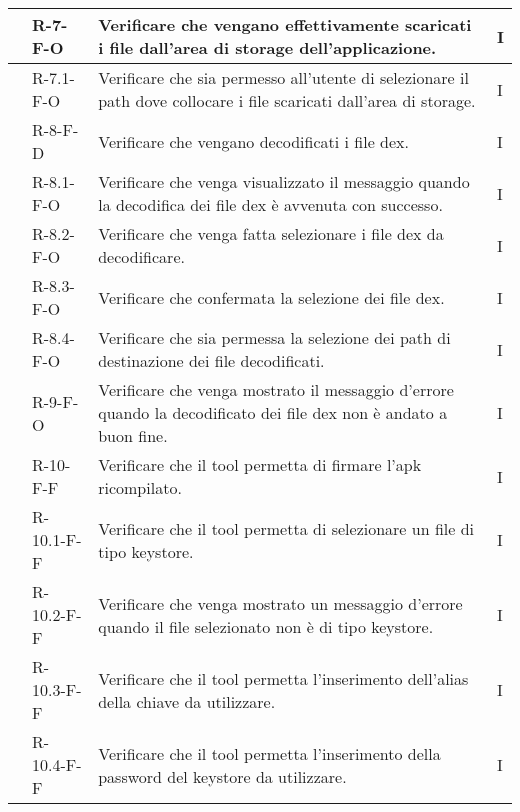 \begin{longtable}{ | C{1.5cm} |C{2cm} |C{7cm} |C{1.5cm}|}
     & R-7-F-O    & Verificare che vengano effettivamente scaricati i file dall'area di storage dell'applicazione.& I \\\hline
     & R-7.1-F-O  & Verificare che sia permesso all'utente di selezionare il path dove collocare i file scaricati dall'area di storage.& I \\\hline
     & R-8-F-D    & Verificare che vengano decodificati i file dex.& I \\\hline
     & R-8.1-F-O  & Verificare che venga visualizzato il messaggio quando la decodifica dei file dex è avvenuta con successo.& I \\\hline
     & R-8.2-F-O  & Verificare che venga fatta selezionare i file dex da decodificare.& I \\\hline
     & R-8.3-F-O  & Verificare che confermata la selezione dei file dex.& I \\\hline
     & R-8.4-F-O  & Verificare che sia permessa la selezione dei path di destinazione dei file decodificati.& I \\\hline
     & R-9-F-O    & Verificare che venga mostrato il messaggio d'errore quando la decodificato dei file dex non è andato a buon fine.& I \\\hline
     & R-10-F-F   & Verificare che il tool permetta di firmare l'apk ricompilato.& I \\\hline
     & R-10.1-F-F & Verificare che il tool permetta di selezionare un file di tipo keystore.& I \\\hline
     & R-10.2-F-F & Verificare che venga mostrato un messaggio d'errore quando il file selezionato non è di tipo keystore.& I \\\hline
     & R-10.3-F-F & Verificare che il tool permetta l'inserimento dell'alias della chiave da utilizzare.& I \\\hline
     & R-10.4-F-F & Verificare che il tool permetta l'inserimento della password del keystore da utilizzare.& I \\\hline


\end{longtable}
